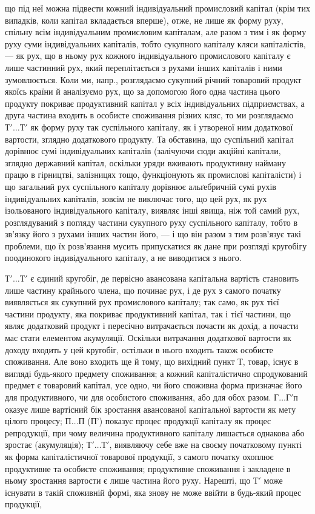 \parcont{}  %
що під неї можна підвести кожний індивідуальний промисловий капітал (крім тих випадків, коли капітал
вкладається вперше), отже, не лише як форму руху, спільну всім індивідуальним промисловим капіталам,
але разом з тим і як форму руху суми індивідуальних капіталів, тобто сукупного капіталу кляси
капіталістів, — як рух, що в ньому рух кожного індивідуального промислового капіталу є лише
частинний рух, який переплітається з рухами інших капіталів і ними зумовлюється. Коли ми, напр.,
розглядаємо сукупний річний товаровий продукт якоїсь країни й аналізуємо рух, що за допомогою його
одна частина цього продукту покриває продуктивний капітал у всіх індивідуальних підприємствах, а
друга частина входить в особисте споживання різних кляс, то ми розглядаємо $Т'\dots{} Т'$ як форму руху
так суспільного капіталу, як і утвореної ним додаткової вартости, зглядно додаткового продукту. Та
обставина, що суспільний капітал дорівнює сумі індивідуальних капіталів (залічуючи сюди акційні
капітали, зглядно державний капітал, оскільки уряди вживають продуктивну найману працю в гірництві,
залізницях тощо, функціонують як промислові капіталісти) і що загальний рух суспільного капіталу
дорівнює альґебричній сумі рухів
індивідуальних капіталів, зовсім не виключає того, що цей рух, як рух ізольованого індивідуального
капіталу, виявляє інші явища, ніж той самий рух, розглядуваний з погляду частини сукупного руху
суспільного капіталу, тобто в зв’язку його з рухами інших частин його, — і що він разом з тим
розв’язує такі проблеми, що їх розв’язання мусить припускатися як дане при розгляді кругобігу
поодинокого індивідуального капіталу, а не виводитися з нього.

$Т'\dots{} Т'$ є єдиний кругобіг, де первісно авансована капітальна вартість становить лише частину
крайнього члена, що починає рух, і де рух з самого початку виявляється як сукупний рух промислового
капіталу; так само, як рух тієї частини продукту, яка покриває продуктивний капітал, так і тієї
частини, що являє додатковий продукт і пересічно витрачається почасти як дохід, а почасти має стати
елементом акумуляції. Оскільки витрачання додаткової вартости як доходу входить у цей кругобіг,
остільки в нього входить також особисте споживання. Але воно входить ще й тому, що вихідний пункт Т,
товар, існує в вигляді будь-якого предмету споживання; а кожний капіталістично спродукований предмет
є товаровий капітал, усе одно, чи його споживна форма призначає його для продуктивного, чи для
особистого споживання, або для обох разом. $Г\dots{} Г' п$оказує лише вартісний бік зростання авансованої
капітальної вартости як мету цілого процесу; $П\dots{} П$ (П') показує процес продукції капіталу як процес
репродукції, при чому величина продуктивного капіталу лишається однакова або зростає (акумуляція);
$Т'\dots{} Т'$, виявляючу себе вже на своєму початковому пункті як форма капіталістичної товарової
продукції, з самого початку охоплює продуктивне та особисте споживання; продуктивне споживання і
закладене в ньому зростання вартости є лише частина його руху. Нарешті, що $Т'$ може існувати в такій
споживній формі, яка знову не може ввійти в будь-який процес продукції,
\parbreak{}  %
